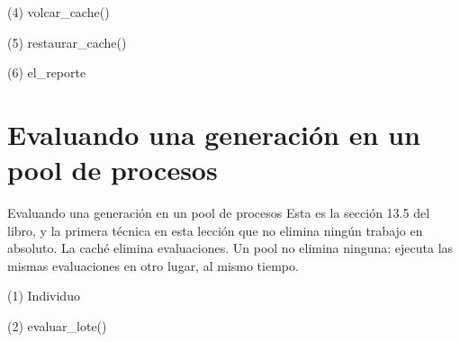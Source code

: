 \begin{frame}[fragile]{(4) volcar\_cache()}

\end{frame}

\begin{frame}[fragile]{(5) restaurar\_cache()}

\end{frame}

\begin{frame}[fragile]{(6) el\_reporte}

\end{frame}


\section{Evaluando una generación en un pool de procesos}

\begin{frame}{Evaluando una generación en un pool de procesos}
Esta es la sección 13.5 del libro, y la primera técnica en esta lección que
no elimina ningún trabajo en absoluto. La caché elimina evaluaciones. Un pool no elimina
ninguna: ejecuta las mismas evaluaciones en otro lugar, al mismo tiempo.
\end{frame}

\begin{frame}[fragile]{(1) Individuo}

\end{frame}

\begin{frame}[fragile]{(2) evaluar\_lote()}

\end{frame}

